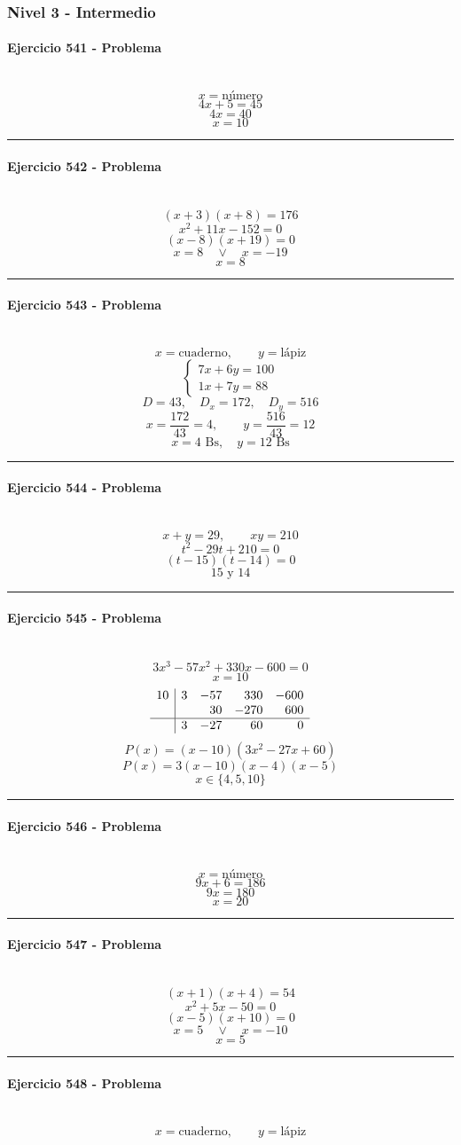 \documentclass[10pt,a4paper]{article}
\newcommand{\res}[1]{\paragraph{#1}\mbox{}\\[-1.2em]}
\begin{document}
\subsubsection*{Nivel 3 - Intermedio}
\res{Ejercicio 541 - Problema}
\[ x=\text{número} \]
\[ 4x+5=45 \]
\[ 4x=40 \]
\[ \boxed{x=10} \]
\vspace{1mm}\hrule\vspace{2mm}
\res{Ejercicio 542 - Problema}
\[ (x+3)(x+8)=176 \]
\[ x^{2} + 11 x - 152=0 \]
\[ (x-8)(x+19)=0 \]
\[ x=8\quad \vee \quad x=-19 \]
\[ \boxed{x=8} \]
\vspace{1mm}\hrule\vspace{2mm}
\res{Ejercicio 543 - Problema}
\[ x=\text{cuaderno},\qquad y=\text{lápiz} \]
\[ \begin{cases}7x+6y=100\\1x+7y=88\end{cases} \]
\[ D=43,\quad D_x=172,\quad D_y=516 \]
\[ x=\frac{172}{43}=4,\qquad y=\frac{516}{43}=12 \]
\[ \boxed{x=4\text{ Bs},\quad y=12\text{ Bs}} \]
\vspace{1mm}\hrule\vspace{2mm}
\res{Ejercicio 544 - Problema}
\[ x+y=29,\qquad xy=210 \]
\[ t^2-29t+210=0 \]
\[ (t-15)(t-14)=0 \]
\[ \boxed{15\text{ y }14} \]
\vspace{1mm}\hrule\vspace{2mm}
\res{Ejercicio 545 - Problema}
\[ 3 x^{3} - 57 x^{2} + 330 x - 600=0 \]
\[ x=10 \]
\[\begin{array}{r|rrrr}10 & 3 & -57 & 330 & -600\\  &  & 30 & -270 & 600\\\hline  & 3 & -27 & 60 & 0\end{array}\]
\[ P(x)=(x-10)(3 x^{2} - 27 x + 60) \]
\[ P(x)=3(x-10)(x-4)(x-5) \]
\[ \boxed{x\in\{4,5,10\}} \]
\vspace{1mm}\hrule\vspace{2mm}
\res{Ejercicio 546 - Problema}
\[ x=\text{número} \]
\[ 9x+6=186 \]
\[ 9x=180 \]
\[ \boxed{x=20} \]
\vspace{1mm}\hrule\vspace{2mm}
\res{Ejercicio 547 - Problema}
\[ (x+1)(x+4)=54 \]
\[ x^{2} + 5 x - 50=0 \]
\[ (x-5)(x+10)=0 \]
\[ x=5\quad \vee \quad x=-10 \]
\[ \boxed{x=5} \]
\vspace{1mm}\hrule\vspace{2mm}
\res{Ejercicio 548 - Problema}
\[ x=\text{cuaderno},\qquad y=\text{lápiz} \]
\end{document}
